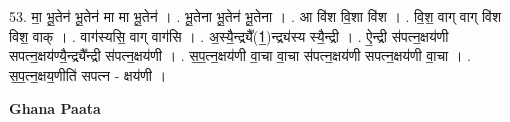 \documentclass[17pt]{extarticle}
\begin{document}
53. मा॒ भू॒तेन॑ भू॒तेन॑ मा मा भू॒तेन॑ । . भू॒तेना भू॒तेन॑ भू॒तेना । . आ वि॑श वि॒शा वि॑श । . वि॒श॒ वाग् वाग् वि॑श विश॒ वाक् । . वाग॑स्यसि॒ वाग् वाग॑सि । . अ॒स्यै॒न्द्र्यै᳚(1॒)न्द्र्य॑स्य स्यै॒न्द्री । . ऐ॒न्द्री स॑पत्न॒क्षय॑णी सपत्न॒क्षय॑ण्यै॒न्द्र्यै᳚न्द्री स॑पत्न॒क्षय॑णी । . स॒प॒त्न॒क्षय॑णी वा॒चा वा॒चा स॑पत्न॒क्षय॑णी सपत्न॒क्षय॑णी वा॒चा । . स॒प॒त्न॒क्षय॒णीति॑ सपत्न - क्षय॑णी । \newline

\textbf{Ghana Paata } \newline
\end{document}
